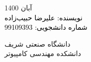 \begin{titlepage}
\textsc{{\large آبان 1400}}\\[2cm] %

\textcolor{black}{
نویسنده:
علیرضا حبیب‌زاده
\\
شماره دانشجویی:
99109393
}
\vfill

\textsc{\normalsize 
دانشگاه صنعتی شریف\\
دانشکده مهندسی کامپیوتر
}

\vfill %

\end{titlepage}